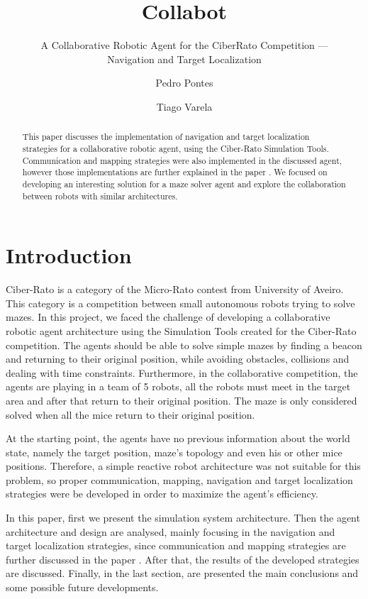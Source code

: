\documentclass[oribibl]{llncs}
\title{Collabot}
\subtitle{A Collaborative Robotic Agent for the CiberRato Competition ---\\
Navigation and Target Localization}
\author{Pedro Pontes \and Tiago Varela}
\institute{Faculdade de Engenharia da Universidade do Porto}
\begin{document}
\maketitle
\begin{abstract}
This paper discusses the implementation of navigation and target localization strategies for a  collaborative robotic agent, using the Ciber-Rato Simulation Tools. Communication and mapping strategies were also implemented in the discussed agent, however those implementations are further explained in the paper \cite{MoreiraBabo2012}.
We focused on developing an interesting solution for a maze solver agent and explore the collaboration between robots with similar architectures.
\end{abstract}

\section{Introduction}
Ciber-Rato is a category of the Micro-Rato contest from University of Aveiro.
This category is a competition between small autonomous robots trying to solve mazes. \cite{Lau2002}
In this project, we faced the challenge of developing a collaborative robotic agent architecture using the Simulation Tools created for the Ciber-Rato competition. The agents should be able to solve simple mazes by finding a beacon and returning to their original position, while avoiding obstacles, collisions and dealing with time constraints. Furthermore, in the collaborative competition, the agents are playing in a team of 5 robots, all the robots must meet in the target area and after that return to their original position. The maze is only considered solved when all the mice return to their original position.

At the starting point, the agents have no previous information about the world state, namely the target position, maze's topology and even his or other mice positions. Therefore, a simple reactive robot architecture was not suitable for this problem, so proper communication, mapping, navigation and target localization strategies were be developed in order to maximize the agent's efficiency.

In this paper, first we present the simulation system architecture. Then the agent architecture and design are analysed, mainly focusing in the navigation and target localization strategies, since communication and mapping strategies are further discussed in the paper \cite{MoreiraBabo2012}. After that, the results of the developed strategies are discussed. Finally, in the last section, are presented the main conclusions and some possible future developments.
\end{document}
